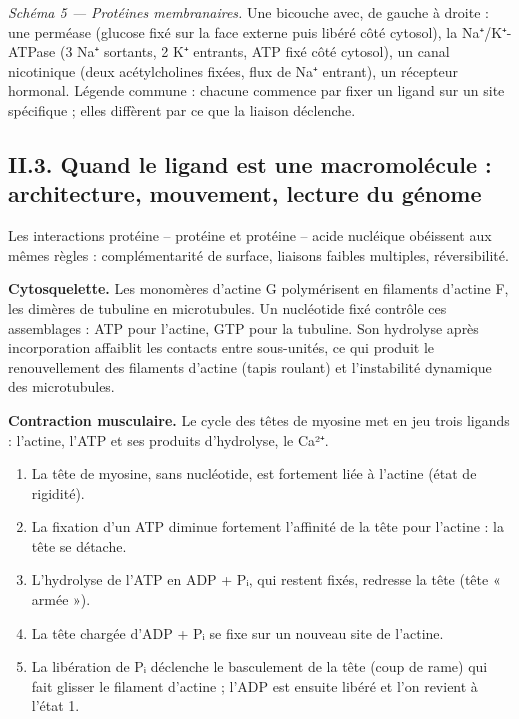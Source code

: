 \documentclass[11pt,a4paper]{article}
\providecommand{\tightlist}{\setlength{\itemsep}{0pt}\setlength{\parskip}{0pt}}
\begin{document}
\emph{Schéma 5 --- Protéines membranaires.} Une bicouche avec, de gauche à droite : une perméase (glucose fixé sur la face externe puis libéré côté cytosol), la Na⁺/K⁺-ATPase (3 Na⁺ sortants, 2 K⁺ entrants, ATP fixé côté cytosol), un canal nicotinique (deux acétylcholines fixées, flux de Na⁺ entrant), un récepteur hormonal. Légende commune : chacune commence par fixer un ligand sur un site spécifique ; elles diffèrent par ce que la liaison déclenche.

\hypertarget{ii.3.-quand-le-ligand-est-une-macromoluxe9cule-architecture-mouvement-lecture-du-guxe9nome}{%
\subsection{II.3. Quand le ligand est une macromolécule : architecture, mouvement, lecture du génome}\label{ii.3.-quand-le-ligand-est-une-macromoluxe9cule-architecture-mouvement-lecture-du-guxe9nome}}

Les interactions protéine -- protéine et protéine -- acide nucléique obéissent aux mêmes règles : complémentarité de surface, liaisons faibles multiples, réversibilité.

\textbf{Cytosquelette.} Les monomères d'actine G polymérisent en filaments d'actine F, les dimères de tubuline en microtubules. Un nucléotide fixé contrôle ces assemblages : ATP pour l'actine, GTP pour la tubuline. Son hydrolyse après incorporation affaiblit les contacts entre sous-unités, ce qui produit le renouvellement des filaments d'actine (tapis roulant) et l'instabilité dynamique des microtubules.

\textbf{Contraction musculaire.} Le cycle des têtes de myosine met en jeu trois ligands : l'actine, l'ATP et ses produits d'hydrolyse, le Ca²⁺.

\begin{enumerate}
\def\labelenumi{\arabic{enumi}.}
\tightlist
\item
  La tête de myosine, sans nucléotide, est fortement liée à l'actine (état de rigidité).
\item
  La fixation d'un ATP diminue fortement l'affinité de la tête pour l'actine : la tête se détache.
\item
  L'hydrolyse de l'ATP en ADP + Pᵢ, qui restent fixés, redresse la tête (tête « armée »).
\item
  La tête chargée d'ADP + Pᵢ se fixe sur un nouveau site de l'actine.
\item
  La libération de Pᵢ déclenche le basculement de la tête (coup de rame) qui fait glisser le filament d'actine ; l'ADP est ensuite libéré et l'on revient à l'état 1.
\end{enumerate}
\end{document}
